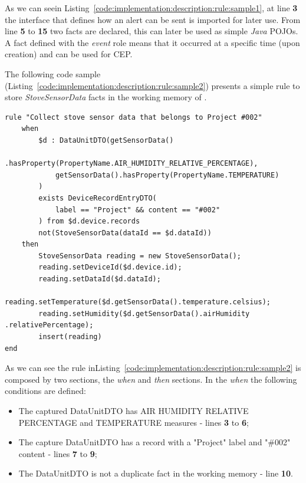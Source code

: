 As we can seein Listing~\ref{code:implementation:description:rule:sample1}, at line \textbf{3} the interface that defines how an alert can be sent is imported for later use.
From line \textbf{5} to \textbf{15} two facts are declared, this can later be used as simple \textit{Java} POJOs. A fact defined with the \textit{event} role means that it occurred at a specific time (upon creation) and can be used for \gls{CEP}.

The following code sample (Listing~\ref{code:implementation:description:rule:sample2}) presents a simple rule to store \textit{StoveSensorData} facts in the working memory of .

\begin{lstlisting}[style=drools, caption=Rule Scenario Example - Part 2, label={code:implementation:description:rule:sample2}]
rule "Collect stove sensor data that belongs to Project #002"
    when
        $d : DataUnitDTO(getSensorData()
            .hasProperty(PropertyName.AIR_HUMIDITY_RELATIVE_PERCENTAGE),
            getSensorData().hasProperty(PropertyName.TEMPERATURE)
        )
        exists DeviceRecordEntryDTO(
            label == "Project" && content == "#002"
        ) from $d.device.records
        not(StoveSensorData(dataId == $d.dataId))
    then
        StoveSensorData reading = new StoveSensorData();
        reading.setDeviceId($d.device.id);
        reading.setDataId($d.dataId);
        reading.setTemperature($d.getSensorData().temperature.celsius);
        reading.setHumidity($d.getSensorData().airHumidity .relativePercentage);
        insert(reading)
end
\end{lstlisting}

As we can see the rule inListing~\ref{code:implementation:description:rule:sample2} is composed by two sections, the \textit{when} and \textit{then} sections. In the \textit{when} the following conditions are defined:

\begin{itemize}
    \item The captured DataUnitDTO has AIR HUMIDITY RELATIVE PERCENTAGE and TEMPERATURE measures - lines \textbf{3} to \textbf{6};
    \item The capture DataUnitDTO has a record with a "Project" label and "\#002" content - lines \textbf{7} to \textbf{9};
    \item The DataUnitDTO is not a duplicate fact in the working memory - line \textbf{10}.
\end{itemize}

